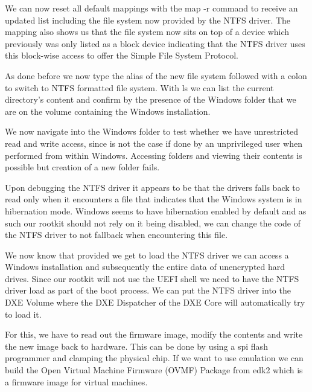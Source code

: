 We can now reset all default mappings with the map -r command to receive an updated list including the file system now provided by the NTFS driver. The mapping also shows us that the file system now sits on top of a device which previously was only listed as a block device indicating that the NTFS driver uses this block-wise access to offer the Simple File System Protocol.

As done before we now type the alias of the new file system followed with a colon to switch to NTFS formatted file system. With ls we can list the current directory's content and confirm by the presence of the Windows folder that we are on the volume containing the Windows installation.


We now navigate into the Windows folder to test whether we have unrestricted read and write access, since is not the case if done by an unprivileged user when performed from within Windows. Accessing folders and viewing their contents is possible but creation of a new folder fails.

Upon debugging the NTFS driver it appears to be that the drivers falls back to read only when it encounters a file that indicates that the Windows system is in hibernation mode. Windows seems to have hibernation enabled by default and as such our rootkit should not rely on it being disabled, we can change the code of the NTFS driver to not fallback when encountering this file.

We now know that provided we get to load the NTFS driver we can access a Windows installation and subsequently the entire data of unencrypted hard drives. Since our rootkit will not use the UEFI shell we need to have the NTFS driver load as part of the boot process.
We can put the NTFS driver into the DXE Volume where the DXE Dispatcher of the DXE Core will automatically try to load it.

For this, we have to read out the firmware image, modify the contents and write the new image back to hardware. This can be done by using a spi flash programmer and clamping the physical chip.
If we want to use emulation we can build the Open Virtual Machine Firmware (OVMF) Package from edk2 which is a firmware image for virtual machines.

